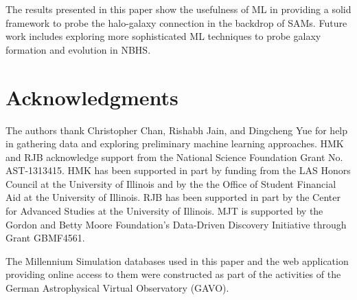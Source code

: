 \documentclass[a4paper,fleqn,usenatbib]{mnras}
\begin{document}
The results presented in this paper show the usefulness of ML in providing a solid framework to probe the halo-galaxy connection in the backdrop of SAMs. Future work includes exploring more sophisticated ML techniques to probe galaxy formation and evolution in NBHS. 
\section*{Acknowledgments}

The authors thank Christopher Chan, Rishabh Jain, and Dingcheng Yue for help in gathering data and exploring preliminary machine learning approaches. HMK and RJB acknowledge support from the National Science Foundation Grant No. AST-1313415. HMK has been supported in part by funding from the LAS Honors Council at the University of Illinois and by the the Office of Student Financial Aid at the University of Illinois. RJB has been supported in part by the Center for Advanced Studies at the University of Illinois. MJT is supported by the Gordon and Betty Moore Foundation's Data-Driven Discovery Initiative through Grant GBMF4561.

The Millennium Simulation databases used in this paper and the web application providing online access to them were constructed as part of the activities of the German Astrophysical Virtual Observatory (GAVO).

\footnotesize{
	
	
}

\bsp
\label{lastpage}
\end{document}
